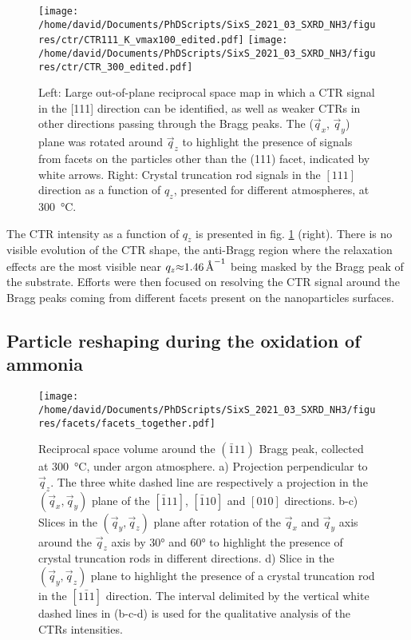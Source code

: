 \begin{figure}[!htb]
    \centering
    \texttt{[image: /home/david/Documents/PhDScripts/SixS\_2021\_03\_SXRD\_NH3/figures/ctr/CTR111\_K\_vmax100\_edited.pdf]}
    \texttt{[image: /home/david/Documents/PhDScripts/SixS\_2021\_03\_SXRD\_NH3/figures/ctr/CTR\_300\_edited.pdf]}
    \caption{
        Left: Large out-of-plane reciprocal space map in which a CTR signal in the [111] direction can be identified, as well as weaker CTRs in other directions passing through the Bragg peaks.
        The ($\vec{q}_x$, $\vec{q}_y$) plane was rotated around $\vec{q}_z$ to highlight the presence of signals from facets on the particles other than the (111) facet, indicated by white arrows.
        Right: Crystal truncation rod signals in the $[111]$ direction as a function of $q_z$, presented for different atmospheres, at \qty{300}{\degreeCelsius}.
    }
    \label{fig:2DCTR111Particles}
\end{figure}

The CTR intensity as a function of $q_z$ is presented in fig. \ref{fig:2DCTR111Particles} (right).
There is no visible evolution of the CTR shape, the anti-Bragg region where the relaxation effects are the most visible near $q_z \qty{\approx1.46}{\per\angstrom}$ being masked by the Bragg peak of the substrate.
Efforts were then focused on resolving the CTR signal around the Bragg peaks coming from different facets present on the nanoparticles surfaces.

\subsection{Particle reshaping during the oxidation of ammonia}

\begin{figure}[!htb]
    \centering
    \texttt{[image: /home/david/Documents/PhDScripts/SixS\_2021\_03\_SXRD\_NH3/figures/facets/facets\_together.pdf]}
    \caption{
        Reciprocal space volume around the $(\bar{1}11)$ Bragg peak, collected at \qty{300}{\degreeCelsius}, under argon atmosphere.
        a) Projection perpendicular to $\vec{q}_z$.
        The three white dashed line are respectively a projection in the $(\vec{q}_x, \vec{q}_y)$ plane of the $[\bar{1}11]$, $[\bar{1}10]$ and $[010]$ directions.
        b-c) Slices in the $(\vec{q}_y, \vec{q}_z)$ plane after rotation of the $\vec{q}_x$ and $\vec{q}_y$ axis around the $\vec{q}_z$ axis by \ang{30} and \ang{60} to highlight the presence of crystal truncation rods in different directions.
        d) Slice in the $(\vec{q}_y, \vec{q}_z)$ plane to highlight the presence of a crystal truncation rod in the $[1\bar{1}1]$ direction.
        The interval delimited by the vertical white dashed lines in (b-c-d) is used for the qualitative analysis of the CTRs intensities.
    }
    \label{fig:FacetMaps}
\end{figure}


